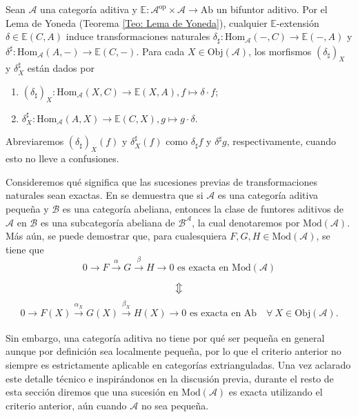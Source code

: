 \documentclass[tesis]{subfiles}
\begin{document}
\begin{Def}\cite[Definition 3.1]{NakaokaPalu}
    Sean $\mathscr{A}$ una categoría aditiva y $\mathbb{E}:\mathscr{A}^\text{op}\times\mathscr{A}\to \text{Ab}$ un bifuntor aditivo. Por el Lema de Yoneda (Teorema \ref{Teo: Lema de Yoneda}), cualquier $\mathbb{E}$-extensión $\delta\in\mathbb{E}(C,A)$ induce transformaciones naturales $\delta_\sharp:\text{Hom}_\mathscr{A}(-,C)\to \mathbb{E}(-,A)$ y $\delta^\sharp:\text{Hom}_\mathscr{A}(A,-)\to \mathbb{E}(C,-)$. Para cada $X\in\text{Obj}(\mathscr{A})$, los morfismos $(\delta_\sharp)_X$ y $\delta^\sharp_X$ están dados por

    \begin{enumerate}[label=(\alph*)]
    
        \item $(\delta_\sharp)_X: \text{Hom}_\mathscr{A}(X,C) \to \mathbb{E}(X,A), f\mapsto \delta\cdot f$;

        \item $\delta_X^\sharp:\text{Hom}_\mathscr{A}(A,X) \to \mathbb{E}(C,X), g\mapsto g\cdot\delta$.
    \end{enumerate}
    Abreviaremos $(\delta_\sharp)_X(f)$ y $\delta^\sharp_X(f)$ como $\delta_\sharp f$ y $\delta^\sharp g$, respectivamente, cuando esto no lleve a confusiones.
\end{Def}

\begin{Obs}\cite[Remark 3.4]{NakaokaPalu}\label{NakaokaPalu-3.4}
    Consideremos qué significa que las sucesiones previas de transformaciones naturales sean exactas. En \cite[Lema~2.13.3]{Santiago_Tesis_Licenciatura} se demuestra que si $\mathscr{A}$ es una categoría aditiva pequeña y $\mathscr{B}$ es una categoría abeliana, entonces la clase de funtores aditivos de $\mathscr{A}$ en $\mathscr{B}$ es una subcategoría abeliana de $\mathscr{B}^\mathscr{A}$, la cual denotaremos por $\text{Mod}(\mathscr{A})$. Más aún, se puede demostrar que, para cualesquiera $F,G,H\in\text{Mod}(\mathscr{A})$, se tiene que
\[
    0\to F\xrightarrow[]{\alpha}G\xrightarrow[]{\beta}H\to 0 \text{ es exacta en } \text{Mod}(\mathscr{A}) 
\]
\[
    \big\Updownarrow
\] 
\[
    0\to F(X)\xrightarrow[]{\alpha_X} G(X)\xrightarrow[]{\beta_X} H(X)\to 0 \text{ es exacta en Ab} \quad \forall \ X\in\text{Obj}(\mathscr{A}).
\] 

\noindent Sin embargo, una categoría aditiva no tiene por qué ser pequeña en general \textemdash aunque por definición sea localmente pequeña\textemdash, por lo que el criterio anterior no siempre es estrictamente aplicable en categorías extrianguladas. Una vez aclarado este detalle técnico e inspirándonos en la discusión previa, durante el resto de esta sección diremos que una sucesión en $\text{Mod}(\mathscr{A})$ es exacta utilizando el criterio anterior, aún cuando $\mathscr{A}$ no sea pequeña. 
\end{Obs}
\end{document}

